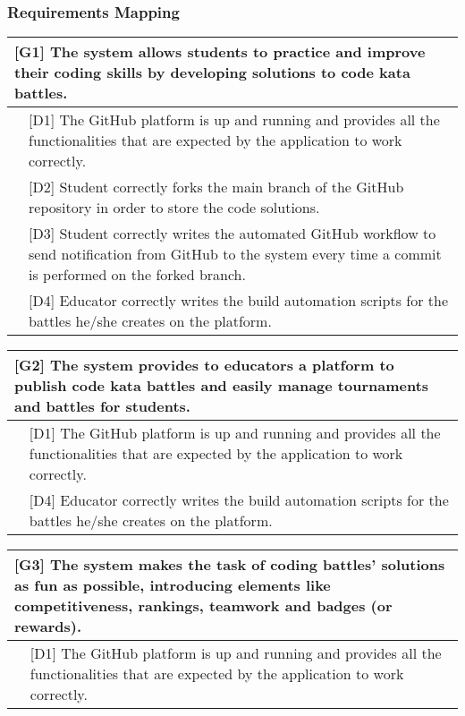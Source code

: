 \subsubsection{Requirements Mapping}

\hspace{0.5cm}

\begin{tabular}{|p{8cm}|p{8cm}|}
\hline
\multicolumn{2}{|p{16cm}|}{\textbf{[G1] The system allows students to practice and improve their coding skills by developing solutions to code kata battles.}}\\
\hline
 & [D1] The GitHub platform is up and running and provides all the functionalities that are expected by the application to work correctly. \\
 & [D2] Student correctly forks the main branch of the GitHub repository in order to store the code solutions. \\
 & [D3] Student correctly writes the automated GitHub workflow to send notification from GitHub to the system every time a commit is performed on the forked branch. \\
 & [D4] Educator correctly writes the build automation scripts for the battles he/she creates on the platform. \\
\hline
\end{tabular}



\vspace{1cm}

\begin{tabular}{|p{8cm}|p{8cm}|}
\hline
\multicolumn{2}{|p{16cm}|}{\textbf{[G2] The system provides to educators a platform to publish code kata battles and easily manage tournaments and battles for students.}}\\
\hline
 & [D1] The GitHub platform is up and running and provides all the functionalities that are expected by the application to work correctly. \\
 & [D4] Educator correctly writes the build automation scripts for the battles he/she creates on the platform. \\
\hline
\end{tabular}

\vspace{1cm}

\begin{tabular}{|p{8cm}|p{8cm}|}
\hline
\multicolumn{2}{|p{16cm}|}{\textbf{[G3] The system makes the task of coding battles' solutions as fun as possible, introducing elements like competitiveness, rankings, teamwork and badges (or rewards).}}\\
\hline
 & [D1] The GitHub platform is up and running and provides all the functionalities that are expected by the application to work correctly. \\
\hline
\end{tabular}